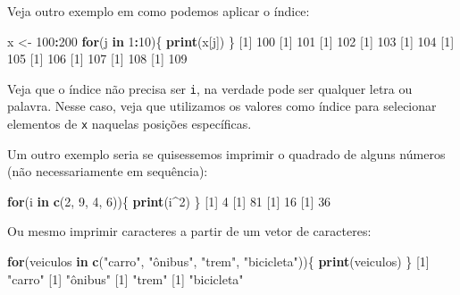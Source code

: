 \documentclass[10pt,a4paper]{book}
\newenvironment{Shaded}{\begin{snugshade}}{\end{snugshade}}
\newcommand{\KeywordTok}[1]{\textcolor[rgb]{0.13,0.29,0.53}{\textbf{#1}}}
\newcommand{\DecValTok}[1]{\textcolor[rgb]{0.00,0.00,0.81}{#1}}
\newcommand{\StringTok}[1]{\textcolor[rgb]{0.31,0.60,0.02}{#1}}
\newcommand{\ControlFlowTok}[1]{\textcolor[rgb]{0.13,0.29,0.53}{\textbf{#1}}}
\newcommand{\OperatorTok}[1]{\textcolor[rgb]{0.81,0.36,0.00}{\textbf{#1}}}
\newcommand{\NormalTok}[1]{#1}
\begin{document}
Veja outro exemplo em como podemos aplicar o índice:

\begin{Shaded}
\begin{Highlighting}[]
\NormalTok{x <-}\StringTok{ }\DecValTok{100}\OperatorTok{:}\DecValTok{200}
\ControlFlowTok{for}\NormalTok{(j }\ControlFlowTok{in} \DecValTok{1}\OperatorTok{:}\DecValTok{10}\NormalTok{)\{}
    \KeywordTok{print}\NormalTok{(x[j])}
\NormalTok{\}}
\NormalTok{[}\DecValTok{1}\NormalTok{] }\DecValTok{100}
\NormalTok{[}\DecValTok{1}\NormalTok{] }\DecValTok{101}
\NormalTok{[}\DecValTok{1}\NormalTok{] }\DecValTok{102}
\NormalTok{[}\DecValTok{1}\NormalTok{] }\DecValTok{103}
\NormalTok{[}\DecValTok{1}\NormalTok{] }\DecValTok{104}
\NormalTok{[}\DecValTok{1}\NormalTok{] }\DecValTok{105}
\NormalTok{[}\DecValTok{1}\NormalTok{] }\DecValTok{106}
\NormalTok{[}\DecValTok{1}\NormalTok{] }\DecValTok{107}
\NormalTok{[}\DecValTok{1}\NormalTok{] }\DecValTok{108}
\NormalTok{[}\DecValTok{1}\NormalTok{] }\DecValTok{109}
\end{Highlighting}
\end{Shaded}

Veja que o índice não precisa ser \texttt{i}, na verdade pode ser
qualquer letra ou palavra. Nesse caso, veja que utilizamos os valores
como índice para selecionar elementos de \texttt{x} naquelas posições
específicas.

Um outro exemplo seria se quisessemos imprimir o quadrado de alguns
números (não necessariamente em sequência):

\begin{Shaded}
\begin{Highlighting}[]
\ControlFlowTok{for}\NormalTok{(i }\ControlFlowTok{in} \KeywordTok{c}\NormalTok{(}\DecValTok{2}\NormalTok{, }\DecValTok{9}\NormalTok{, }\DecValTok{4}\NormalTok{, }\DecValTok{6}\NormalTok{))\{}
    \KeywordTok{print}\NormalTok{(i}\OperatorTok{^}\DecValTok{2}\NormalTok{)}
\NormalTok{\}}
\NormalTok{[}\DecValTok{1}\NormalTok{] }\DecValTok{4}
\NormalTok{[}\DecValTok{1}\NormalTok{] }\DecValTok{81}
\NormalTok{[}\DecValTok{1}\NormalTok{] }\DecValTok{16}
\NormalTok{[}\DecValTok{1}\NormalTok{] }\DecValTok{36}
\end{Highlighting}
\end{Shaded}

Ou mesmo imprimir caracteres a partir de um vetor de caracteres:

\begin{Shaded}
\begin{Highlighting}[]
\ControlFlowTok{for}\NormalTok{(veiculos }\ControlFlowTok{in} \KeywordTok{c}\NormalTok{(}\StringTok{"carro"}\NormalTok{, }\StringTok{"ônibus"}\NormalTok{, }\StringTok{"trem"}\NormalTok{, }\StringTok{"bicicleta"}\NormalTok{))\{}
    \KeywordTok{print}\NormalTok{(veiculos)}
\NormalTok{\}}
\NormalTok{[}\DecValTok{1}\NormalTok{] }\StringTok{"carro"}
\NormalTok{[}\DecValTok{1}\NormalTok{] }\StringTok{"ônibus"}
\NormalTok{[}\DecValTok{1}\NormalTok{] }\StringTok{"trem"}
\NormalTok{[}\DecValTok{1}\NormalTok{] }\StringTok{"bicicleta"}
\end{Highlighting}
\end{Shaded}
\end{document}
